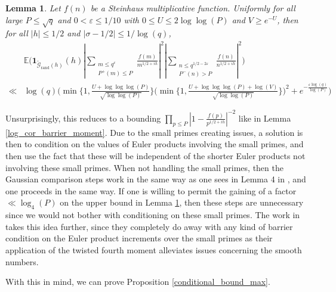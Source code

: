 \documentclass[reqno]{amsart}
\newtheorem{lemma}{Lemma}
\theoremstyle{definition}
\theoremstyle{remark}
\numberwithin{equation}{section}
\theoremstyle{remark}
\begin{document}
\begin{lemma}
    Let $f(n)$ be a Steinhaus multiplicative function. Uniformly for all large $P \leq \sqrt{q}$ and $0 < \varepsilon \leq 1/10$ with $0 \leq U \leq 2\log\log(P)$ and $V \geq e^{-U}$, then for all $|h| \leq 1/2$ and $|\sigma-1/2| \leq 1/\log(q)$,
    \begin{align*}
        &\mathbb{E}\big(\mathbf{1}_{\widetilde{\mathcal{G}}_{\text{rand}}(h)}(h)|\sum_{\substack{m \leq q^\varepsilon \\ P^+(m) \leq P}}\frac{f(m)}{m^{1/2+ih}}|^2|\sum_{\substack{n \leq q^{1/2-2\varepsilon} \\ P^-(n) > P}}\frac{f(n)}{n^{1/2+ih}}|^2\big)\\ \ll& \log(q)\big(\min\big\{1,\frac{U+\log\log\log(P)}{\sqrt{\log\log(P)}}\big\}\big(\min\big\{1,\frac{U+\log\log\log(P)+\log(V)}{\sqrt{\log\log(P)}}\big\}\big)^2+e^{-\frac{\varepsilon\log(q)}{\log(P)}}\big) 
    \end{align*} \label{log_cor_max_moment}
\end{lemma}
Unsurprisingly, this reduces to a bounding $\prod_{p \leq P}|1-\frac{f(p)}{p^{1/2+ih}}|^{-2}$ like in Lemma \ref{log_cor_barrier_moment}. Due to the small primes creating issues, a solution is then to condition on the values of Euler products involving the small primes, and then use the fact that these will be independent of the shorter Euler products not involving these small primes. When not handling the small primes, then the Gaussian comparison steps work in the same way as one sees in Lemma 4 in \cite{harper2019partition}, and one proceeds in the same way. If one is willing to permit the gaining of a factor $\ll \log_4(P)$ on the upper bound in Lemma \ref{log_cor_max_moment}, then these steps are unnecessary since we would not bother with conditioning on these small primes. The work in \cite{abr20} takes this idea further, since they completely do away with any kind of barrier condition on the Euler product increments over the small primes as their application of the twisted fourth moment alleviates issues concerning the smooth numbers.  \par
With this in mind, we can prove Proposition \ref{conditional_bound_max}.
\end{document}
